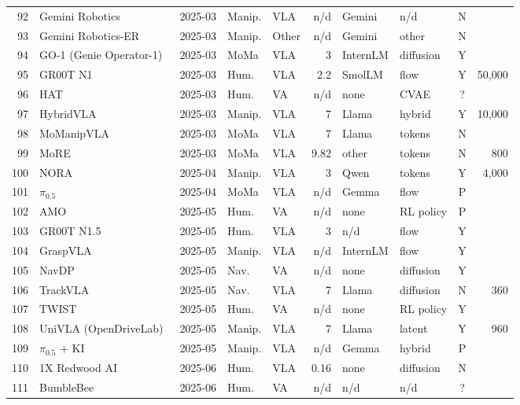 \begin{longtable}{@{}r p{3.55cm} l l l r l l c r@{}}
92 & Gemini Robotics~\cite{ax250320020} & 2025-03 & Manip. & VLA & n/d & Gemini & n/d & N & \\
93 & Gemini Robotics-ER~\cite{ax250320020} & 2025-03 & Manip. & Other & n/d & Gemini & other & N & \\
94 & GO-1 (Genie Operator-1)~\cite{ax250306669} & 2025-03 & MoMa & VLA & 3 & InternLM & diffusion & Y & \\
95 & GR00T N1~\cite{ax250314734} & 2025-03 & Hum. & VLA & 2.2 & SmolLM & flow & Y & 50,000\\
96 & HAT~\cite{ax250313441} & 2025-03 & Hum. & VA & n/d & none & CVAE & ? & \\
97 & HybridVLA~\cite{ax250310631} & 2025-03 & Manip. & VLA & 7 & Llama & hybrid & Y & 10,000\\
98 & MoManipVLA~\cite{ax250313446} & 2025-03 & MoMa & VLA & 7 & Llama & tokens & N & \\
99 & MoRE~\cite{ax250308007} & 2025-03 & MoMa & VLA & 9.82 & other & tokens & N & 800\\
100 & NORA~\cite{ax250419854} & 2025-04 & Manip. & VLA & 3 & Qwen & tokens & Y & 4,000\\
101 & $\pi_{0.5}$~\cite{ax250416054} & 2025-04 & MoMa & VLA & n/d & Gemma & flow & P & \\
102 & AMO~\cite{ax250503738} & 2025-05 & Hum. & VA & n/d & none & RL policy & P & \\
103 & GR00T N1.5~\cite{web-gr00t-n1-5} & 2025-05 & Hum. & VLA & 3 & n/d & flow & Y & \\
104 & GraspVLA~\cite{ax250503233} & 2025-05 & Manip. & VLA & n/d & InternLM & flow & Y & \\
105 & NavDP~\cite{ax250508712} & 2025-05 & Nav. & VA & n/d & none & diffusion & Y & \\
106 & TrackVLA~\cite{ax250523189} & 2025-05 & Nav. & VLA & 7 & Llama & diffusion & N & 360\\
107 & TWIST~\cite{ax250502833} & 2025-05 & Hum. & VA & n/d & none & RL policy & Y & \\
108 & UniVLA (OpenDriveLab)~\cite{ax250506111} & 2025-05 & Manip. & VLA & 7 & Llama & latent & Y & 960\\
109 & $\pi_{0.5}$ + KI~\cite{ax250523705} & 2025-05 & Manip. & VLA & n/d & Gemma & hybrid & P & \\
110 & 1X Redwood AI~\cite{web-1x-redwood-ai} & 2025-06 & Hum. & VLA & 0.16 & none & diffusion & N & \\
111 & BumbleBee~\cite{ax250612779} & 2025-06 & Hum. & VA & n/d & n/d & n/d & ? & \\

\end{longtable}

